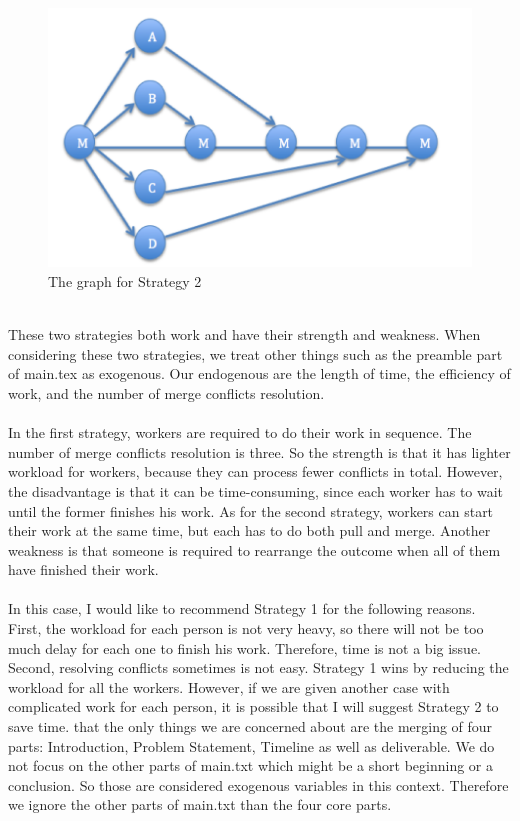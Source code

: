 \documentclass[12pt]{article}
\begin{document}
\\
\begin{figure}[h]
    \begin{center}
        \includegraphics[scale=0.6]{s2.png}
    \end{center}
    \caption{The graph for Strategy 2}
    \label{fig:branch}
\end{figure}
\\
These two strategies both work and have their strength and weakness. When considering these two strategies, we treat other things such as the preamble part of main.tex as exogenous. Our endogenous are the length of time, the efficiency of work, and the number of merge conflicts resolution. \\
\\
In the first strategy, workers are required to do their work in sequence. The number of merge conflicts resolution is three. So the strength is that it has lighter workload for workers, because they can process fewer conflicts in total. However, the disadvantage is that it can be time-consuming, since each worker has to wait until the former finishes his work. As for the second strategy, workers can start their work at the same time, but each has to do both pull and merge. Another weakness is that someone is required to rearrange the outcome when all of them have finished their work. \\
\\
In this case, I would like to recommend Strategy 1 for the following reasons. First, the workload for each person is not very heavy, so there will not be too much delay for each one to finish his work. Therefore, time is not a big issue. Second, resolving conflicts sometimes is not easy. Strategy 1 wins by reducing the workload for all the workers. However, if we are given another case with complicated work for each person, it is possible that I will suggest Strategy 2 to save time.
that the only things we are concerned about are the merging of four parts: Introduction, Problem
Statement, Timeline as well as deliverable. We do not focus on the other parts of main.txt which
might be a short beginning or a conclusion. So those are considered exogenous variables in this
context. Therefore we ignore the other parts of main.txt than the four core parts.
\end{document}
